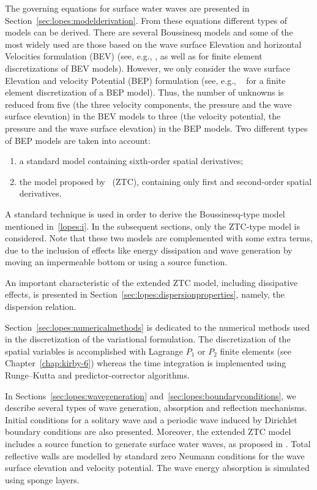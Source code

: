 The governing equations for surface water waves are presented in
Section~\ref{sec:lopes:modelderivation}. From these equations
different types of models can be derived. There are several Boussinesq
models and some of the most widely used are those based on the wave
surface Elevation and horizontal Velocities formulation (BEV) (see,
e.g., \citet{WalkleyBerzins2002}, \citet{WooLiu2004a} as well as
\citet{WooLiu2004b} for finite element discretizations of BEV models).
However, we only consider the wave surface Elevation and velocity
Potential (BEP) formulation (see, e.g.,
~\citet{LangtangenPedersen1998} for a finite element discretization of
a BEP model).  Thus, the number of unknowns is reduced from five (the
three velocity components, the pressure and the wave surface
elevation) in the BEV models to three (the velocity potential, the
pressure and the wave surface elevation) in the BEP models. Two
different types of BEP models are taken into account:
\begin{enumerate}
\item \label{lopes:i}  a standard  model containing sixth-order
  spatial derivatives;
\item the  model proposed by~\citet{ZhaoTengCheng2004} (ZTC),
 containing only first and second-order spatial derivatives.
\end{enumerate}

A standard technique is used in order to derive the Boussinesq-type
model mentioned in~\ref{lopes:i}.  In the subsequent sections, only
the ZTC-type model is considered.  Note that these two models are
complemented with some extra terms, due to the inclusion of effects
like energy dissipation and wave generation by moving an impermeable
bottom or using a source function.

An important characteristic of the extended ZTC model, including
dissipative effects, is presented in
Section~\ref{sec:lopes:dispersionproperties}, namely, the dispersion
relation.

Section~\ref{sec:lopes:numericalmethods} is dedicated to the numerical
methods used in the discretization of the variational formulation.
The discretization of the spatial variables is accomplished with
Lagrange $P_1$ or $P_2$ finite elements (see
Chapter~\ref{chap:kirby-6}) whereas the time integration is
implemented using Runge--Kutta and predictor-corrector algorithms.

In Sections~\ref{sec:lopes:wavegeneration}
and~\ref{sec:lopes:boundaryconditions}, we describe several types of
wave generation, absorption and reflection mechanisms. Initial
conditions for a solitary wave and a periodic wave induced by
Dirichlet boundary conditions are also presented. Moreover, the
extended ZTC model includes a source function to generate surface
water waves, as proposed in \citet{WeiKirbySinha1999}. Total
reflective walls are modelled by standard zero Neumann conditions for
the wave surface elevation and velocity potential.  The wave energy
absorption is simulated using sponge layers.

